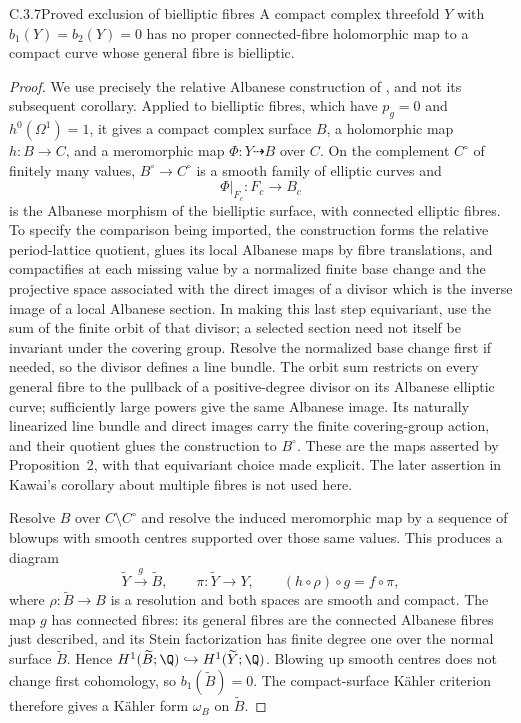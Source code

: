 \begin{idstatement}{C.3.7}{Proved exclusion of bielliptic fibres}
\label{st:C.3.7}
A compact complex threefold $Y$ with $b_1(Y)=b_2(Y)=0$ has no
proper connected-fibre holomorphic map to a compact curve whose
general fibre is bielliptic.
\end{idstatement}
\begin{proof}
We use precisely the relative Albanese construction of
\cite[Proposition~2, pp.~605--608]{Kawai1969}, and not its subsequent
corollary. Applied to bielliptic fibres, which have
$p_g=0$ and $h^0(\Omega^1)=1$, it gives a compact complex surface
$B$, a holomorphic map $h:B\to C$, and a meromorphic map
$\Phi:Y\dashrightarrow B$ over $C$. On the complement $C^\circ$
of finitely many values, $B^\circ\to C^\circ$ is a smooth family
of elliptic curves and
\[
 \Phi|_{F_c}:F_c\longrightarrow B_c
\]
is the Albanese morphism of the bielliptic surface, with connected
elliptic fibres. To specify the comparison being imported, the
construction forms the relative period-lattice quotient, glues its
local Albanese maps by fibre translations, and compactifies at each
missing value by a normalized finite base change and the projective
space associated with the direct images of a divisor which is the
inverse image of a local Albanese section. In making this last
step equivariant, use the sum of the finite orbit of that divisor;
a selected section need not itself be invariant under the covering
group. Resolve the normalized base change first if needed, so the
divisor defines a line bundle. The orbit sum restricts on every
general fibre to the pullback of a positive-degree divisor on its
Albanese elliptic curve; sufficiently large powers give the same
Albanese image. Its naturally linearized line bundle and direct
images carry the finite covering-group action, and their quotient
glues the construction to $B^\circ$. These are the maps asserted by
Proposition~2, with that equivariant choice made explicit. The
later assertion in Kawai's corollary about multiple fibres is not
used here.

Resolve $B$ over $C\setminus C^\circ$ and resolve the induced
meromorphic map by a sequence of blowups with smooth centres
supported over those same values. This produces a diagram
\[
 \widetilde Y\xrightarrow{\ g\ }\widetilde B,
 \qquad \pi:\widetilde Y\longrightarrow Y,
 \qquad (h\circ\rho)\circ g=f\circ\pi,
\]
where $\rho:\widetilde B\to B$ is a resolution and both spaces
are smooth and compact. The map $g$ has connected fibres:
its general fibres are the connected Albanese fibres just described,
and its Stein factorization has finite degree one over the normal
surface $\widetilde B$. Hence
$H^1(\widetilde B;\Q)\hookrightarrow H^1(\widetilde Y;\Q)$.
Blowing up smooth centres does not change first cohomology, so
$b_1(\widetilde B)=0$. The compact-surface K\"ahler criterion
\cite[Theorem~1.1]{Peters1990} therefore gives a K\"ahler form
$\omega_B$ on $\widetilde B$.


\end{proof}
